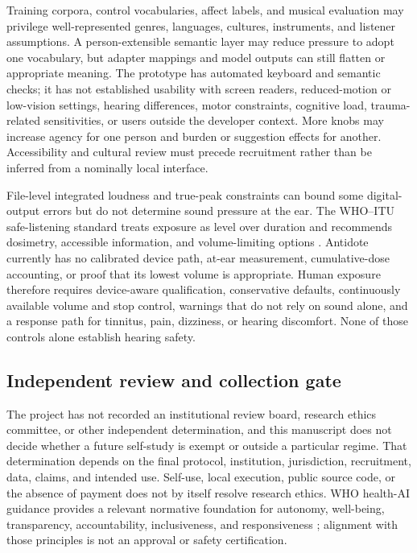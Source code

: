 Training corpora, control vocabularies, affect labels, and musical evaluation
may privilege well-represented genres, languages, cultures, instruments, and
listener assumptions. A person-extensible semantic layer may reduce pressure to
adopt one vocabulary, but adapter mappings and model outputs can still flatten
or appropriate meaning. The prototype has automated keyboard and semantic
checks; it has not established usability with screen readers, reduced-motion or
low-vision settings, hearing differences, motor constraints, cognitive load,
trauma-related sensitivities, or users outside the developer context. More
knobs may increase agency for one person and burden or suggestion effects for
another. Accessibility and cultural review must precede recruitment rather than
be inferred from a nominally local interface.

File-level integrated loudness and true-peak constraints can bound some
digital-output errors but do not determine sound pressure at the ear. The
WHO--ITU safe-listening standard treats exposure as level over duration and
recommends dosimetry, accessible information, and volume-limiting options
\citep{whoitu2019safelistening}. Antidote currently has no calibrated device
path, at-ear measurement, cumulative-dose accounting, or proof that its lowest
volume is appropriate. Human exposure therefore requires device-aware
qualification, conservative defaults, continuously available volume and stop
control, warnings that do not rely on sound alone, and a response path for
tinnitus, pain, dizziness, or hearing discomfort. None of those controls alone
establish hearing safety.

\subsection{Independent review and collection gate}
\label{sec:ethics-review-gate}

The project has not recorded an institutional review board, research ethics
committee, or other independent determination, and this manuscript does not
decide whether a future self-study is exempt or outside a particular regime.
That determination depends on the final protocol, institution, jurisdiction,
recruitment, data, claims, and intended use. Self-use, local execution, public
source code, or the absence of payment does not by itself resolve research
ethics. WHO health-AI guidance provides a relevant normative foundation for
autonomy, well-being, transparency, accountability, inclusiveness, and
responsiveness \citep{who2021ethics}; alignment with those principles is not an
approval or safety certification.

